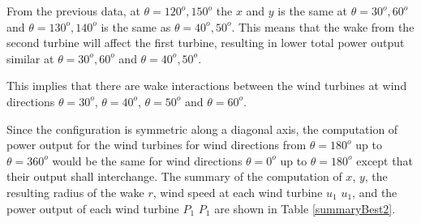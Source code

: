     From the previous data, at $\theta=120^{o},150^{o}$ the $x$ and $y$ is the same at $\theta=30^{o},60^{o}$ and $\theta=130^{o},140^{o}$ is the same as $\theta=40^{o},50^{o}$. This means that the wake from the second turbine will affect the first turbine, resulting in lower total power output similar at $\theta=30^{o},60^{o}$ and $\theta=40^{o},50^{o}$.
    
    
    
    
    This implies that there are wake interactions between the wind turbines at wind directions $\theta=30^o$, $\theta=40^o$, $\theta=50^o$ and $\theta=60^o$.
    
    Since the configuration is symmetric along a diagonal axis, the computation of power output for the wind turbines for wind directions from $\theta=180^o$ up to $\theta=360^o$ would be the same for wind directions $\theta=0^o$ up to $\theta=180^o$ except that their output shall interchange. The summary of the computation of $x$, $y$, the resulting radius of the wake $r$, wind speed at each wind turbine $u_1$ $u_1$, and the power output of each wind turbine $P_1$ $P_1$ are shown in Table \ref{summaryBest2}.
    
